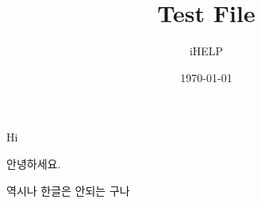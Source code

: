 \documentclass[a4paper,10pt]{report}
\title{Test File}
\author{iHELP}
\date{\today}
\begin{document}
\maketitle
Hi

안녕하세요. 

역시나 한글은 안되는 구나
\end{document}
